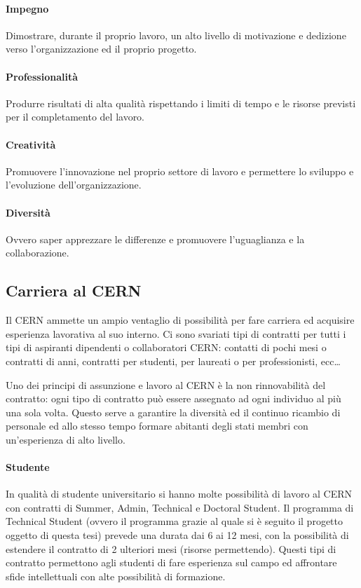 			\paragraph{Impegno}Dimostrare, durante il proprio lavoro, un alto livello di motivazione e dedizione verso l'organizzazione ed il proprio progetto.
			
			\paragraph{Professionalit\`{a}}Produrre risultati di alta qualità rispettando i limiti di tempo e le risorse previsti per il completamento del lavoro.
			
			\paragraph{Creativit\`{a}}Promuovere l'innovazione nel proprio settore di lavoro e permettere lo sviluppo e l'evoluzione dell'organizzazione.
			
			\paragraph{Diversit\`{a}}Ovvero saper apprezzare le differenze e promuovere l'uguaglianza e la collaborazione.
		
		\subsection{Carriera al CERN} \label{subsec:C;l;carriera}
		
			Il \ac{CERN} ammette un ampio ventaglio di possibilità per fare carriera ed acquisire esperienza lavorativa al suo interno. Ci sono svariati tipi di contratti per tutti i tipi di aspiranti dipendenti o collaboratori \ac{CERN}: contatti di pochi mesi o contratti di anni, contratti per studenti, per laureati o per professionisti, ecc\dots \cite{cern:carreer}
			
			Uno dei principi di assunzione e lavoro al \ac{CERN} è la non rinnovabilità del contratto: ogni tipo di contratto può essere assegnato ad ogni individuo al più una sola volta. Questo serve a garantire la diversità ed il continuo ricambio di personale ed allo stesso tempo formare abitanti degli stati membri con un'esperienza di alto livello.
			
			\paragraph{Studente}In qualità di studente universitario si hanno molte possibilità di lavoro al \ac{CERN} con contratti di Summer, Admin, Technical e Doctoral Student. Il programma di Technical Student (ovvero il programma grazie al quale si è seguito il progetto oggetto di questa tesi) prevede una durata dai 6 ai 12 mesi, con la possibilità di estendere il contratto di 2 ulteriori mesi (risorse permettendo). Questi tipi di contratto permettono agli studenti di fare esperienza sul campo ed affrontare sfide intellettuali con alte possibilità di formazione.
			

